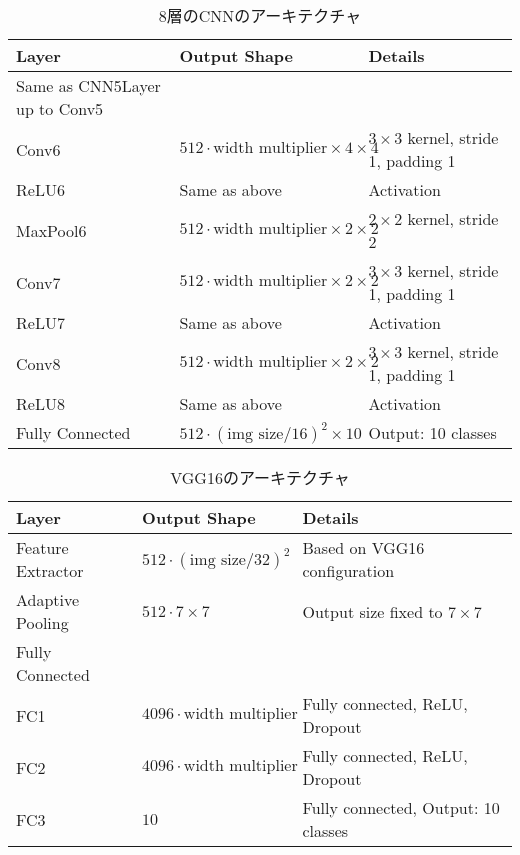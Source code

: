 \begin{table}[h]
    \centering
    \caption{8層のCNNのアーキテクチャ}
    \label{tab:cnn8layer}
    \begin{tabular}{lll}
    \toprule
    \textbf{Layer} & \textbf{Output Shape} & \textbf{Details} \\
    \midrule
    Same as CNN5Layer up to Conv5 & & \\
    Conv6 & $512 \cdot \text{width multiplier} \times 4 \times 4$ & $3 \times 3$ kernel, stride 1, padding 1 \\
    ReLU6 & Same as above & Activation \\
    MaxPool6 & $512 \cdot \text{width multiplier} \times 2 \times 2$ & $2 \times 2$ kernel, stride 2 \\
    Conv7 & $512 \cdot \text{width multiplier} \times 2 \times 2$ & $3 \times 3$ kernel, stride 1, padding 1 \\
    ReLU7 & Same as above & Activation \\
    Conv8 & $512 \cdot \text{width multiplier} \times 2 \times 2$ & $3 \times 3$ kernel, stride 1, padding 1 \\
    ReLU8 & Same as above & Activation \\
    Fully Connected & $512 \cdot (\text{img size}/16)^2 \times 10$ & Output: 10 classes \\
    \bottomrule
    \end{tabular}
\end{table}

\begin{table}[h]
    \centering
    \caption{VGG16のアーキテクチャ}
    \label{tab:vgg16}
    \begin{tabular}{lll}
    \toprule
    \textbf{Layer} & \textbf{Output Shape} & \textbf{Details} \\
    \midrule
    Feature Extractor & $512 \cdot (\text{img size}/32)^2$ & Based on VGG16 configuration \\
    Adaptive Pooling & $512 \cdot 7 \times 7$ & Output size fixed to $7 \times 7$ \\
    Fully Connected & & \\
    FC1 & $4096 \cdot \text{width multiplier}$ & Fully connected, ReLU, Dropout \\
    FC2 & $4096 \cdot \text{width multiplier}$ & Fully connected, ReLU, Dropout \\
    FC3 & $10$ & Fully connected, Output: 10 classes \\
    \bottomrule
    \end{tabular}
\end{table}
